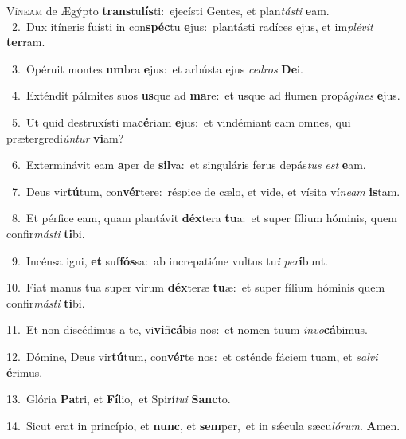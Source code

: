 \lettrine{\initial\textcolor{\initialcolor}{V}}{íneam} de Ægýpto \textbf{trans}\-tu\-\textbf{lís}\-ti:~\star ejecísti Gentes, et plan\-\textit{tás}\-\textit{ti} \textbf{e}\-am.\\
{\numbfont\textcolor{\numbcolor}{~2.}}~Dux itíneris fuísti in con\-\textbf{spéc}\-tu \textbf{e}\-jus:~\star plantásti radíces ejus, et im\-\textit{plé}\-\textit{vit} \textbf{ter}\-ram.\par
{\numbfont\textcolor{\numbcolor}{~3.}}~Opéruit montes \textbf{um}\-bra \textbf{e}\-jus:~\star et arbústa ejus \textit{ce}\-\textit{dros} \textbf{De}\-i.\par
{\numbfont\textcolor{\numbcolor}{~4.}}~Exténdit pálmites suos \textbf{us}\-que ad \textbf{ma}\-re:~\star et usque ad flumen propá\-\textit{gi}\-\textit{nes} \textbf{e}\-jus.\par
{\numbfont\textcolor{\numbcolor}{~5.}}~Ut quid destruxísti ma\-\textbf{cé}\-riam \textbf{e}\-jus:~\star et vindémiant eam omnes, qui prætergredi\-\textit{ún}\-\textit{tur} \textbf{vi}\-am?\par
{\numbfont\textcolor{\numbcolor}{~6.}}~Exterminávit eam \textbf{a}\-per de \textbf{sil}\-va:~\star et singuláris ferus depás\textit{tus} \textit{est} \textbf{e}\-am.\par
{\numbfont\textcolor{\numbcolor}{~7.}}~Deus vir\-\textbf{tú}\-tum, con\-\textbf{vér}\-tere:~\star réspice de cælo, et vide, et vísita ví\-\textit{ne}\-\textit{am} \textbf{is}\-tam.\par
{\numbfont\textcolor{\numbcolor}{~8.}}~Et pérfice eam, quam plantávit \textbf{déx}\-tera \textbf{tu}\-a:~\star et super fílium hóminis, quem confir\-\textit{más}\-\textit{ti} \textbf{ti}\-bi.\par
{\numbfont\textcolor{\numbcolor}{~9.}}~Incénsa igni, \textbf{et} suf\-\textbf{fós}\-sa:~\star ab increpatióne vultus tu\textit{i} \textit{per}\-\textbf{í}bunt.\par
{\numbfont\textcolor{\numbcolor}{10.}}~Fiat manus tua super virum \textbf{déx}\-teræ \textbf{tu}\-æ:~\star et super fílium hóminis quem confir\-\textit{más}\-\textit{ti} \textbf{ti}\-bi.\par
{\numbfont\textcolor{\numbcolor}{11.}}~Et non discédimus a te, vi\-\textbf{vi}\-fi\-\textbf{cá}\-bis nos:~\star et nomen tuum \textit{in}\-\textit{vo}\textbf{cá}bimus.\par
{\numbfont\textcolor{\numbcolor}{12.}}~Dómine, Deus vir\-\textbf{tú}\-tum, con\-\textbf{vér}\-te nos:~\star et osténde fáciem tuam, et \textit{sal}\-\textit{vi} \textbf{é}\-rimus.\par
{\numbfont\textcolor{\numbcolor}{13.}}~Glória \textbf{Pa}\-tri, et \textbf{Fí}\-lio,~\star et Spirí\-\textit{tu}\-\textit{i} \textbf{Sanc}\-to.\par
{\numbfont\textcolor{\numbcolor}{14.}}~Sicut erat in princípio, et \textbf{nunc}\-, et \textbf{sem}\-per,~\star et in sǽcula sæcu\-\textit{ló}\-\textit{rum}. \textbf{A}\-men.\par
